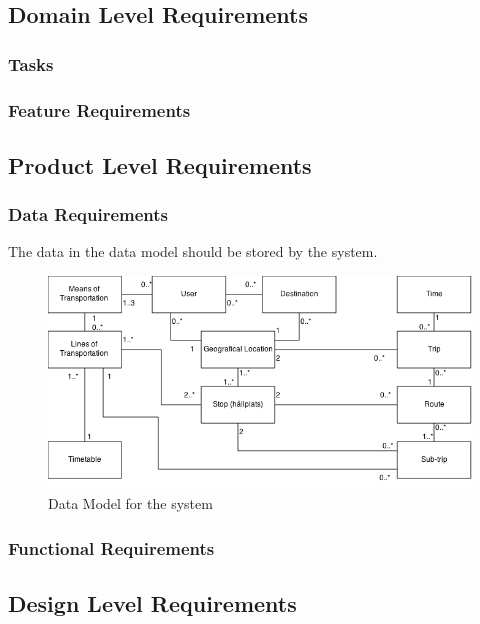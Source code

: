 \documentclass[a4paper]{article}
\begin{document}
		\subsection{Domain Level Requirements}
			\subsubsection{Tasks}
				
			\subsubsection{Feature Requirements}

								
			

		\subsection{Product Level Requirements}		
			\subsubsection{Data Requirements}
				The data in the data model should be stored by the system.	
				\begin{figure}[h]
					\includegraphics[scale=0.50]{img/datamodel-v2.png}
					\caption{Data Model for the system}
				\end{figure}
				
			\pagebreak	

			\subsubsection{Functional Requirements}
				
		

					
				
		\subsection{Design Level Requirements}
		
\end{document}
